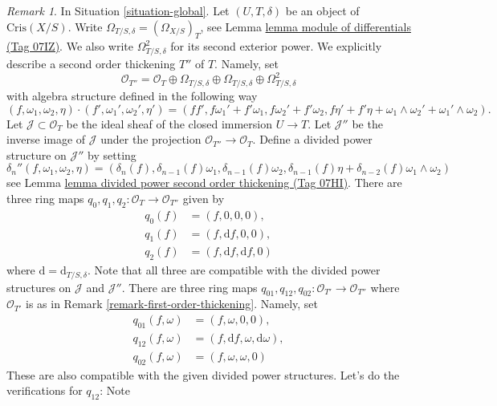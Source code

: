 \documentclass{amsart}
\theoremstyle{plain}
\theoremstyle{definition}
\theoremstyle{remark}
\newtheorem{remark}[subsection]{Remark}
\numberwithin{equation}{subsection}
\begin{document}
\begin{remark}
\label{remark-second-order-thickening}
In Situation \ref{situation-global}.
Let $(U, T, \delta)$ be an object of $\text{Cris}(X/S)$.
Write $\Omega_{T/S, \delta} = (\Omega_{X/S})_T$, see
Lemma \href{https://stacks.math.columbia.edu/tag/07IZ}{lemma module of differentials (Tag 07IZ)}.
We also write $\Omega^2_{T/S, \delta}$ for its second exterior
power. We explicitly describe a second order thickening $T''$ of $T$.
Namely, set
$$
\mathcal{O}_{T''} =
\mathcal{O}_T \oplus \Omega_{T/S, \delta} \oplus \Omega_{T/S, \delta}
\oplus \Omega^2_{T/S, \delta}
$$
with algebra structure defined in the following way
$$
(f, \omega_1, \omega_2, \eta) \cdot
(f', \omega_1', \omega_2', \eta') =
(ff', f\omega_1' + f'\omega_1, f\omega_2' + f'\omega_2,
f\eta' + f'\eta + \omega_1 \wedge \omega_2' + \omega_1' \wedge \omega_2).
$$
Let $\mathcal{J} \subset \mathcal{O}_T$
be the ideal sheaf of the closed immersion $U \to T$. Let
$\mathcal{J}''$ be the inverse image of $\mathcal{J}$ under the
projection $\mathcal{O}_{T''} \to \mathcal{O}_T$.
Define a divided power structure on $\mathcal{J}''$ by setting
$$
\delta_n''(f, \omega_1, \omega_2, \eta) =
(\delta_n(f), \delta_{n - 1}(f)\omega_1, \delta_{n - 1}(f)\omega_2,
\delta_{n - 1}(f)\eta + \delta_{n - 2}(f)\omega_1 \wedge \omega_2)
$$
see Lemma \href{https://stacks.math.columbia.edu/tag/07HI}{lemma divided power second order thickening (Tag 07HI)}.
There are three ring maps
$q_0, q_1, q_2 : \mathcal{O}_T \to \mathcal{O}_{T''}$
given by
\begin{align*}
q_0(f) & = (f, 0, 0, 0), \\
q_1(f) & = (f, \text{d}f, 0, 0), \\
q_2(f) & = (f, \text{d}f, \text{d}f, 0)
\end{align*}
where $\text{d} = \text{d}_{T/S, \delta}$.
Note that all three are compatible with the divided power structures
on $\mathcal{J}$ and $\mathcal{J}''$. There are three ring maps
$q_{01}, q_{12}, q_{02} : \mathcal{O}_{T'} \to \mathcal{O}_{T''}$
where $\mathcal{O}_{T'}$ is as in Remark \ref{remark-first-order-thickening}.
Namely, set
\begin{align*}
q_{01}(f, \omega) & = (f, \omega, 0, 0), \\
q_{12}(f, \omega) & =
(f, \text{d}f, \omega, \text{d}\omega), \\
q_{02}(f, \omega) & = (f, \omega, \omega, 0)
\end{align*}
These are also compatible with the given divided power
structures. Let's do the verifications for $q_{12}$: Note

\end{remark}
\end{document}
